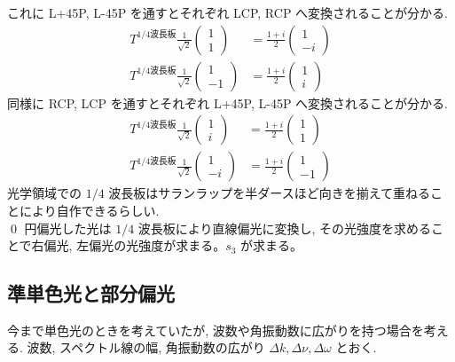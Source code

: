 \documentclass[uplatex,dvipdfmx,a4paper,11pt]{jlreq}
\makeatletter
\newcommand\mqty[1]{\begin{pmatrix}#1\end{pmatrix}}
\theoremstyle{definition}
\renewenvironment{proof}[1][\proofname]{\par
  \normalfont
  \topsep6\p@\@plus6\p@ \trivlist
  \item[\hskip\labelsep{\bfseries #1}\@addpunct{\bfseries}]\ignorespaces\quad\par
}{%
  \qed\endtrivlist\@endpefalse
}
\renewcommand\proofname{証明}
\makeatother
\begin{document}
\begin{proof}
  これに L+45P, L-45P を通すとそれぞれ LCP, RCP へ変換されることが分かる.
  \begin{align}
    T^{1/4\textrm{波長板}}\frac{1}{\sqrt{2}}\mqty{1 \\ 1} & = \frac{1 + i}{2}\mqty{1 \\ -i} \\
    T^{1/4\textrm{波長板}}\frac{1}{\sqrt{2}}\mqty{1 \\ -1} & = \frac{1 + i}{2}\mqty{1 \\ i}
  \end{align}
  同様に RCP, LCP を通すとそれぞれ L+45P, L-45P へ変換されることが分かる.
  \begin{align}
    T^{1/4\textrm{波長板}}\frac{1}{\sqrt{2}}\mqty{1 \\ i} & = \frac{1 + i}{2}\mqty{1 \\ 1} \\
    T^{1/4\textrm{波長板}}\frac{1}{\sqrt{2}}\mqty{1 \\ -i} & = \frac{1 + i}{2}\mqty{1 \\ -1}
  \end{align}
  光学領域での $1/4$ 波長板はサランラップを半ダースほど向きを揃えて重ねることにより自作できるらしい. \\
\end{proof}
円偏光した光は $1/4$ 波長板により直線偏光に変換し, その光強度を求めることで右偏光, 左偏光の光強度が求まる。$s_3$ が求まる。

\subsection{準単色光と部分偏光}
今まで単色光のときを考えていたが, 波数や角振動数に広がりを持つ場合を考える. 波数, スペクトル線の幅, 角振動数の広がり $\Delta k, \Delta\nu, \Delta\omega$ とおく. \\
\end{document}
